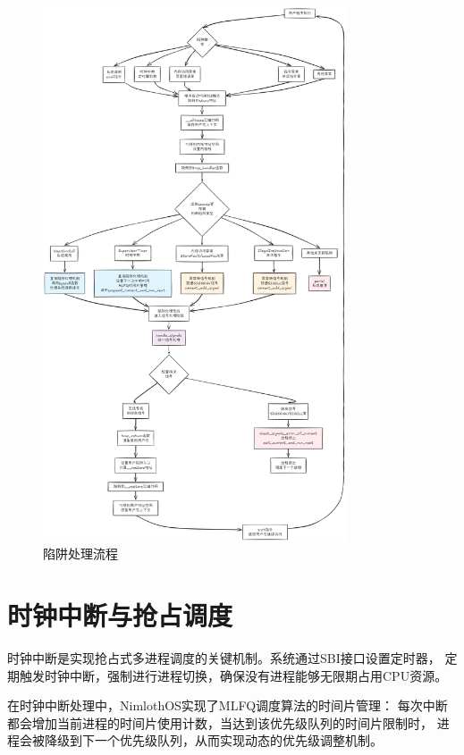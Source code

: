 \begin{figure}[!htbp]
    \centering
    \includegraphics[width=0.8\textwidth]{../image/陷阱信号处理协作.png}
    \caption{陷阱处理流程}
    \label{fig:trap-process}
\end{figure}

\section{时钟中断与抢占调度}

时钟中断是实现抢占式多进程调度的关键机制。系统通过SBI接口设置定时器，
定期触发时钟中断，强制进行进程切换，确保没有进程能够无限期占用CPU资源。

在时钟中断处理中，NimlothOS实现了MLFQ调度算法的时间片管理：
每次中断都会增加当前进程的时间片使用计数，当达到该优先级队列的时间片限制时，
进程会被降级到下一个优先级队列，从而实现动态的优先级调整机制。


